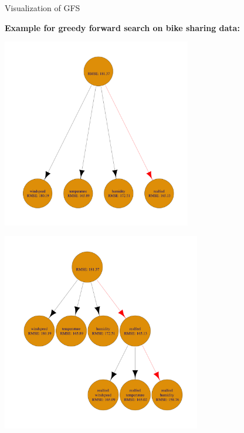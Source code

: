 \documentclass[11pt,compress,t,notes=noshow, xcolor=table]{beamer}
\begin{document}
\begin{vbframe}{Visualization of GFS}
        
    \textbf{Example for greedy forward search on bike sharing data:}
    \begin{center}
    \includegraphics[width = 0.62\textwidth]{figure/fs-wrappers-powerset-tree-1.png}
    \end{center}
    \framebreak

    \begin{center}
      \includegraphics[width = 0.65\textwidth]{figure/fs-wrappers-powerset-tree-2.png}
      \end{center}
      \framebreak
  

\end{vbframe}
\end{document}
